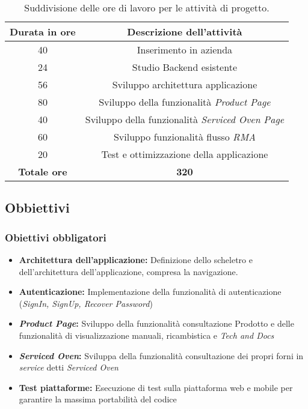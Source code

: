 \begin{table}[ht]
    \centering
    \begin{tabular}{c|c}
    \hline\hline
    \textbf{Durata in ore} & \textbf{Descrizione dell'attività} \\
    \hline\hline
    40 & Inserimento in azienda \\
    \hline
    24 & Studio Backend esistente \\
    \hline
    56 & Sviluppo architettura applicazione\\
    \hline
    80 & Sviluppo della funzionalità \textit{Product Page} \\
    \hline
    40 & Sviluppo della funzionalità \textit{Serviced Oven Page} \\
    \hline
    60 & Sviluppo funzionalità flusso \textit{RMA} \\
    \hline
    20 & Test e ottimizzazione della applicazione \\
    \hline
    \textbf{Totale ore} & \textbf{320} \\
    \hline\hline
    \end{tabular}
    \caption{Suddivisione delle ore di lavoro per le attività di progetto.}
    \label{tab:ore-lavoro}
    \end{table}

\subsection{Obbiettivi}
\subsubsection*{Obiettivi obbligatori}
\begin{itemize}
    \item \textbf{Architettura dell'applicazione:} Definizione dello scheletro e dell'architettura dell'applicazione, compresa la navigazione.
    \item \textbf{Autenticazione: } Implementazione della funzionalità di autenticazione (\textit{SignIn, SignUp, Recover Password})
    \item \textbf{\textit{Product Page}: }Sviluppo della funzionalità consultazione Prodotto e delle funzionalità di visualizzazione manuali, ricambistica e \textit{Tech and Docs} 
    \item \textbf{\textit{Serviced Oven}: }Sviluppa della funzionalità consultazione dei propri forni in \textit{service} detti \textit{Serviced Oven}
    \item \textbf{Test piattaforme: } Esecuzione di test sulla piattaforma web e mobile per garantire la massima portabilità del codice

\end{itemize}

